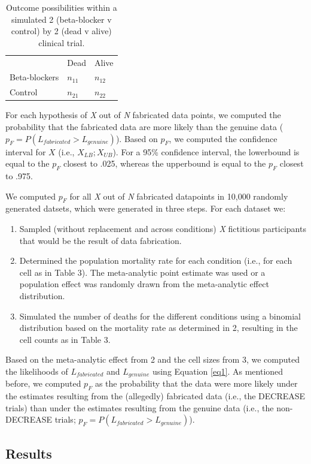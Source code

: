 \documentclass[]{article}
\begin{document}
\begin{longtable}[]{@{}lll@{}}
\caption{Outcome possibilities within a simulated 2 (beta-blocker v
control) by 2 (dead v alive) clinical trial.}\tabularnewline
\toprule
& Dead & Alive\tabularnewline
Beta-blockers & \(n_{11}\) & \(n_{12}\)\tabularnewline
Control & \(n_{21}\) & \(n_{22}\)\tabularnewline
\bottomrule
\end{longtable}

For each hypothesis of \emph{X} out of \emph{N} fabricated data points,
we computed the probability that the fabricated data are more likely
than the genuine data (\(p_F=P(L_{fabricated}>L_{genuine})\)). Based on
\(p_F\), we computed the confidence interval for \(X\) (i.e.,
\(X_{LB};X_{UB}\)). For a 95\% confidence interval, the lowerbound is
equal to the \(p_F\) closest to .025, whereas the upperbound is equal to
the \(p_F\) closest to .975.

We computed \(p_F\) for all \emph{X} out of \emph{N} fabricated
datapoints in 10,000 randomly generated datsets, which were generated in
three steps. For each dataset we:

\begin{enumerate}
\def\labelenumi{\arabic{enumi}.}
\item
  Sampled (without replacement and across conditions) \emph{X}
  fictitious participants that would be the result of data fabrication.
\item
  Determined the population mortality rate for each condition (i.e., for
  each cell as in Table 3). The meta-analytic point estimate was used or
  a population effect was randomly drawn from the meta-analytic effect
  distribution.
\item
  Simulated the number of deaths for the different conditions using a
  binomial distribution based on the mortality rate as determined in 2,
  resulting in the cell counts as in Table 3.
\end{enumerate}

Based on the meta-analytic effect from 2 and the cell sizes from 3, we
computed the likelihoods of \(L_{fabricated}\) and \(L_{genuine}\) using
Equation \ref{eq1}. As mentioned before, we computed \(p_F\) as the
probability that the data were more likely under the estimates resulting
from the (allegedly) fabricated data (i.e., the DECREASE trials) than
under the estimates resulting from the genuine data (i.e., the
non-DECREASE trials; \(p_F=P(L_{fabricated}>L_{genuine})\)).

\subsection{Results}\label{results-2}
\end{document}
